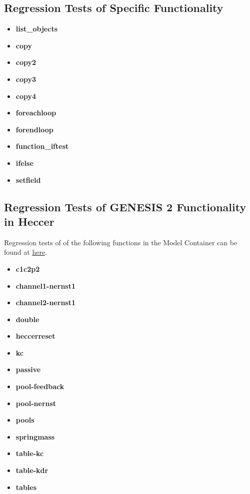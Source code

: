 \documentclass[12pt]{article}
\begin{document}
\subsection*{Regression Tests of Specific Functionality}
   \begin{itemize}
      \item[]{\bf list\_objects}
      \item[]{\bf copy}
      \item[]{\bf copy2}
      \item[]{\bf copy3}
      \item[]{\bf copy4}
      \item[]{\bf foreachloop}
      \item[]{\bf forendloop}
      \item[]{\bf function\_iftest}
      \item[]{\bf ifelse}
      \item[]{\bf setfield}
   \end{itemize}
   
\subsection*{Regression Tests of GENESIS 2 Functionality in Heccer}

Regression tests of of the following functions in the Model Container can be found at \href{http://neurospaces.sourceforge.net/neurospaces_project/ns-sli/tests/html/specifications/heccer/main.html}{here}.

   \begin{itemize}
     \item[]{\bf c1c2p2}
     \item[]{\bf channel1-nernst1}
     \item[]{\bf channel2-nernst1	}
     \item[]{\bf double}
     \item[]{\bf heccerreset}
     \item[]{\bf kc}
     \item[]{\bf passive}
     \item[]{\bf pool-feedback}
     \item[]{\bf pool-nernst}
     \item[]{\bf pools}
     \item[]{\bf springmass}
     \item[]{\bf table-kc}
     \item[]{\bf table-kdr}
     \item[]{\bf tables}
   \end{itemize}
   
\end{document}
